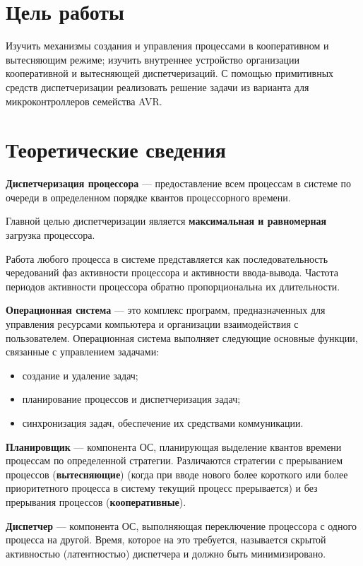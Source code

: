 \section{Цель работы}
Изучить механизмы создания и управления процессами в кооперативном и вытесняющим режиме; изучить внутреннее устройство организации кооперативной и вытесняющей диспетчеризаций. С помощью примитивных средств диспетчеризации реализовать решение задачи из варианта для микроконтроллеров семейства AVR.
\clearpage


\section{Теоретические сведения}
\textbf{Диспетчеризация процессора} — предоставление всем процессам в системе по очереди в определенном порядке квантов процессорного времени.

Главной целью диспетчеризации является \textbf{максимальная и равномерная} загрузка процессора.


Работа любого процесса в системе представляется как последовательность чередований фаз активности процессора и активности ввода-вывода. Частота периодов активности процессора обратно пропорциональна их длительности.

\textbf{Операционная система} — это комплекс программ, предназначенных для управления ресурсами компьютера и организации взаимодействия с пользователем. 
Операционная система выполняет следующие основные функции, связанные с управлением задачами:
\begin{itemize}
    \item создание и удаление задач;
    \item планирование процессов и диспетчеризация задач;
    \item синхронизация задач, обеспечение их средствами коммуникации.
\end{itemize}

\textbf{Планировщик} — компонента ОС, планирующая выделение квантов времени процессам по определенной стратегии. Различаются стратегии с прерыванием процессов (\textbf{вытесняющие}) (когда при вводе нового более короткого или более приоритетного процесса в систему текущий процесс прерывается) и без прерывания процессов (\textbf{кооперативные}).

\textbf{Диспетчер} — компонента ОС, выполняющая переключение процессора с одного процесса на другой. Время, которое на это требуется, называется скрытой активностью (латентностью) диспетчера и должно быть минимизировано.

